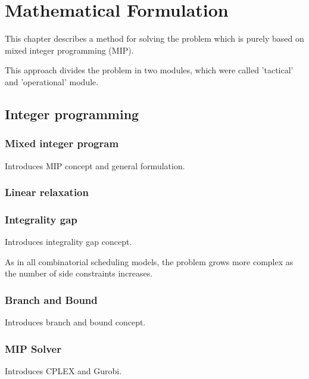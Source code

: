 \chapter{Mathematical Formulation}
\label{chap:mipformulation}



This chapter describes a method for solving the problem which is purely based on mixed integer programming (MIP).

This approach divides the problem in two modules, which were called 'tactical' and 'operational' module.


\section{Integer programming}


\subsection{Mixed integer program}

Introduces MIP concept and general formulation.


\subsection{Linear relaxation}


\subsection{Integrality gap}

Introduces integrality gap concept.

As in all combinatorial scheduling models, the problem grows more complex as the number of side constraints increases.


\subsection{Branch and Bound}

Introduces branch and bound concept.


\subsection{MIP Solver}

Introduces CPLEX and Gurobi.


